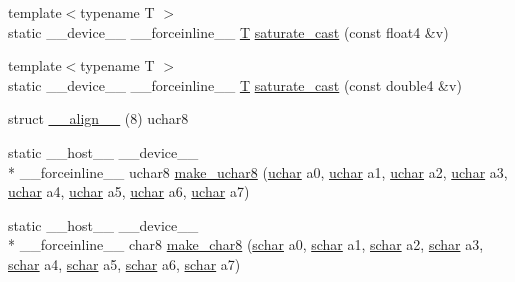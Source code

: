 \begin{DoxyCompactItemize}
\item 
{\footnotesize template$<$typename T $>$ }\\static \-\_\-\-\_\-device\-\_\-\-\_\- \-\_\-\-\_\-forceinline\-\_\-\-\_\- \hyperlink{calib3d_8hpp_a3efb9551a871ddd0463079a808916717}{T} \hyperlink{namespacecv_1_1gpu_1_1device_ae24a7343fa395c8c229cadbc50228ef0}{saturate\-\_\-cast} (const float4 \&v)
\item 
{\footnotesize template$<$typename T $>$ }\\static \-\_\-\-\_\-device\-\_\-\-\_\- \-\_\-\-\_\-forceinline\-\_\-\-\_\- \hyperlink{calib3d_8hpp_a3efb9551a871ddd0463079a808916717}{T} \hyperlink{namespacecv_1_1gpu_1_1device_a47c7684bea915263504677826b8f9176}{saturate\-\_\-cast} (const double4 \&v)
\item 
struct \hyperlink{namespacecv_1_1gpu_1_1device_afc5ac17654c1cd59f78d1d2ab43cfae8}{\-\_\-\-\_\-align\-\_\-\-\_\-} (8) uchar8
\item 
static \-\_\-\-\_\-host\-\_\-\-\_\- \-\_\-\-\_\-device\-\_\-\-\_\- \\*
\-\_\-\-\_\-forceinline\-\_\-\-\_\- uchar8 \hyperlink{namespacecv_1_1gpu_1_1device_a1ace382d840e0245193bb4f8bc2b4251}{make\-\_\-uchar8} (\hyperlink{core_2types__c_8h_a65f85814a8290f9797005d3b28e7e5fc}{uchar} a0, \hyperlink{core_2types__c_8h_a65f85814a8290f9797005d3b28e7e5fc}{uchar} a1, \hyperlink{core_2types__c_8h_a65f85814a8290f9797005d3b28e7e5fc}{uchar} a2, \hyperlink{core_2types__c_8h_a65f85814a8290f9797005d3b28e7e5fc}{uchar} a3, \hyperlink{core_2types__c_8h_a65f85814a8290f9797005d3b28e7e5fc}{uchar} a4, \hyperlink{core_2types__c_8h_a65f85814a8290f9797005d3b28e7e5fc}{uchar} a5, \hyperlink{core_2types__c_8h_a65f85814a8290f9797005d3b28e7e5fc}{uchar} a6, \hyperlink{core_2types__c_8h_a65f85814a8290f9797005d3b28e7e5fc}{uchar} a7)
\item 
static \-\_\-\-\_\-host\-\_\-\-\_\- \-\_\-\-\_\-device\-\_\-\-\_\- \\*
\-\_\-\-\_\-forceinline\-\_\-\-\_\- char8 \hyperlink{namespacecv_1_1gpu_1_1device_a7e825b36136dde7443355c1d1f29fcc0}{make\-\_\-char8} (\hyperlink{core_2types__c_8h_a0fd9ce9d735064461bebfe6037026093}{schar} a0, \hyperlink{core_2types__c_8h_a0fd9ce9d735064461bebfe6037026093}{schar} a1, \hyperlink{core_2types__c_8h_a0fd9ce9d735064461bebfe6037026093}{schar} a2, \hyperlink{core_2types__c_8h_a0fd9ce9d735064461bebfe6037026093}{schar} a3, \hyperlink{core_2types__c_8h_a0fd9ce9d735064461bebfe6037026093}{schar} a4, \hyperlink{core_2types__c_8h_a0fd9ce9d735064461bebfe6037026093}{schar} a5, \hyperlink{core_2types__c_8h_a0fd9ce9d735064461bebfe6037026093}{schar} a6, \hyperlink{core_2types__c_8h_a0fd9ce9d735064461bebfe6037026093}{schar} a7)

\end{DoxyCompactItemize}
